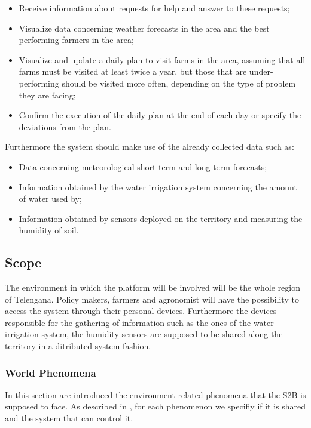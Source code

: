 \begin{description}[font=~\normalfont\scshape]
\begin{itemize}[topsep=0pt,leftmargin=0pt]
            \end{itemize}
    \item[\textbf{\textcolor{myblue}{Agronomist privileges}}]
    \hfill \begin{itemize}[topsep=0pt,leftmargin=0pt]
                \item Receive information about requests for help and answer to these requests;
                \item Visualize data concerning weather forecasts in the area and the best performing farmers in the area;
                \item Visualize and update a daily plan to visit farms in the area, assuming that all farms must be visited at least twice a year, but those that are under-performing should be visited more often, depending on the type of problem they are facing;
                \item Confirm the execution of the daily plan at the end of each day or specify the deviations from the plan.
            \end{itemize}
\end{description}
Furthermore the system should make use of the already collected data such as:
\begin{itemize}
    \item Data concerning meteorological short-term and long-term forecasts;
    \item Information obtained by the water irrigation system concerning the amount of water used by;
    \item Information obtained by sensors deployed on the territory and measuring the humidity of soil.
\end{itemize}
\subsection{Scope}
The environment in which the platform will be involved will be the whole region of Telengana. Policy makers, farmers and agronomist will have the possibility to access the system through their personal devices. Furthermore the devices responsible for the gathering of information such as the ones of the water irrigation system, the humidity sensors are supposed to be shared along the territory in a ditributed system fashion.

\subsubsection{World Phenomena}
In this section are introduced the environment related phenomena that the S2B is supposed to face. As described in \cite{jackson_twatm}, for each phenomenon we specifiy if it is shared and the system that can control it.

